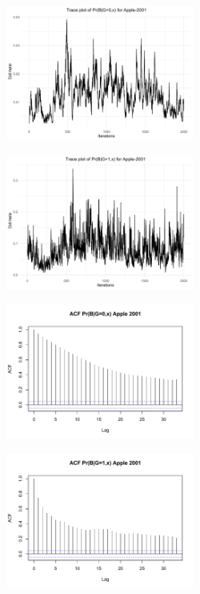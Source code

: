 \documentclass[aoas,preprint, 11pt, dvipsnames, table, x11name]{imsart}
\theoremstyle{remark}
\begin{document}
\begin{figure}[!httb]
	\begin{subfigure}{.5\textwidth}
		\includegraphics[width=6.2cm]{Apple_2001_B1G0}
	\end{subfigure}%
\begin{subfigure}{.5\textwidth}
	\includegraphics[width=6.2cm]{Apple_2001_B1G1}
\end{subfigure}
	\begin{subfigure}{.5\textwidth}
	\includegraphics[width=6.2cm]{Apple_2001_B1G0_acf}
\end{subfigure}%
\begin{subfigure}{.5\textwidth}
	\includegraphics[width=6.2cm]{Apple_2001_B1G1_acf}
\end{subfigure}



\end{figure}
\end{document}
